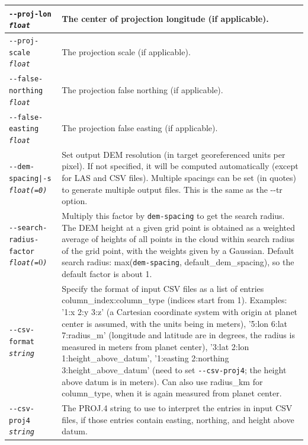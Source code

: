 \begin{longtable}{|p{8cm}|p{9cm}|}
\texttt{-\/-proj-lon \textit{float}} & The center of projection longitude (if applicable). \\ \hline
\texttt{-\/-proj-scale \textit{float}} & The projection scale (if applicable). \\ \hline
\texttt{-\/-false-northing \textit{float}} & The projection false northing (if applicable). \\ \hline
\texttt{-\/-false-easting \textit{float}} & The projection false easting (if applicable). \\ \hline
\texttt{-\/-dem-spacing|-s \textit{float(=0)}} & Set output DEM resolution (in target georeferenced units per pixel). If not specified, it will be computed automatically (except for LAS and CSV files). Multiple spacings can be set (in quotes) to generate multiple output files. This is the same as the -\/-tr option. \\ \hline
\texttt{-\/-search-radius-factor \textit{float(=$0$)}} & Multiply this factor by \texttt{dem-spacing} to get the search radius. The DEM height at a given grid point is obtained as a weighted average of heights of all points in the cloud within search radius of the grid point, with the weights given by a Gaussian. Default search radius: max(\texttt{dem-spacing}, default\_dem\_spacing), so the default factor is about 1.\\ \hline

\texttt{-\/-csv-format \textit{string}} & Specify the format of input
CSV files as a list of entries column\_index:column\_type (indices start
from 1). Examples: '1:x 2:y 3:z' (a Cartesian coordinate system with
origin at planet center is assumed, with the units being in meters),
'5:lon 6:lat 7:radius\_m' (longitude and latitude are in degrees, the
radius is measured in meters from planet center), '3:lat 2:lon
1:height\_above\_datum', '1:easting 2:northing 3:height\_above\_datum'
(need to set \texttt{-\/-csv-proj4}; the height above datum is in
meters). Can also use radius\_km for column\_type, when it is again
measured from planet center. \\ \hline

\texttt{-\/-csv-proj4 \textit{string}} & The PROJ.4 string to use to
interpret the entries in input CSV files, if those entries contain
easting, northing, and height above datum. \\ \hline


\end{longtable}
